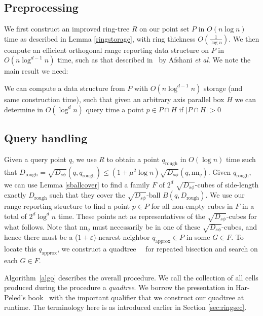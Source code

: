 \documentclass[11pt]{myclass}
\newcommand{\sbreg}{\ensuremath{D_{s\phi}}}
\newcommand{\eps}{\varepsilon}
\newcommand{\etal}{\emph{et al}\xspace}
\begin{document}
\subsection{Preprocessing}
We first construct an improved ring-tree $R$ on our point set $P$ in $O(n \log n)$ time as 
described in Lemma \ref{ringstorage}, with ring thickness $O(\frac{1}{\log n})$. 
We then compute an efficient orthogonal range reporting data structure on $P$ in $O(n \log ^{d-1} n)$ time,
 such as that described in~\cite{rangesearching} by Afshani \etal. We note the main result we need: 

\begin{lemma}\label{rangesearch}
We can compute a data structure from $P$ with $O(n \log ^{d-1} n)$ storage (and same construction time), such that given an arbitrary axis parallel box $H$ we can determine in $O(\log^{d} n)$ query time a point $p \in P \cap H$ if $|P \cap H| > 0$
\end{lemma} 

\subsection{Query handling}
Given a query point $q$, we use $R$ to obtain a point $q_{\text{rough}}$ in $O(\log n)$ time such that $D_{\text{rough}} =  \sqrt{\sbreg}(q, q_{\text{rough}}) \leq (1 + \mu^2 \log n) \sqrt{\sbreg}(q, \text{nn}_q)$. 
Given $q_{\text{rough}}$, we can use Lemma \ref{sballcover} to find a 
family $F$ of $2^d$ $\sqrt{\sbreg}$-cubes of side-length exactly $D_{\text{rough}}$ such that
 they cover the $\sqrt{\sbreg}$-ball $B(q, D_{\text{rough}})$. We use our range reporting structure to find a 
point $p \in P$ for all non-empty cubes in $F$ in a total of $2^d \log^d n$ time.
 These points act as representatives of the $\sqrt{\sbreg}$-cubes for what follows. Note that $\text{nn}_q$ must 
necessarily be in one of these $\sqrt{\sbreg}$-cubes, and hence there must be a ($1+\eps$)-nearest 
neighbor $q_{\text{approx}} \in P$ in some $G \in F$. To locate this $q_{\text{approx}}$, we 
construct a quadtree~\cite[Chapter 11]{snotes}~\cite{skipquadtrees} for repeated bisection and 
search on each $G \in F$.
 
Algorithm~\ref{algo} describes the overall procedure. 
We call the collection of all cells produced during the procedure a \emph{quadtree}.
We borrow the presentation in Har-Peled's book~\cite{snotes} with the important qualifier 
that we construct our quadtree at runtime. The terminology here is as introduced earlier in 
Section \ref{sec:ringsec}.
\end{document}
